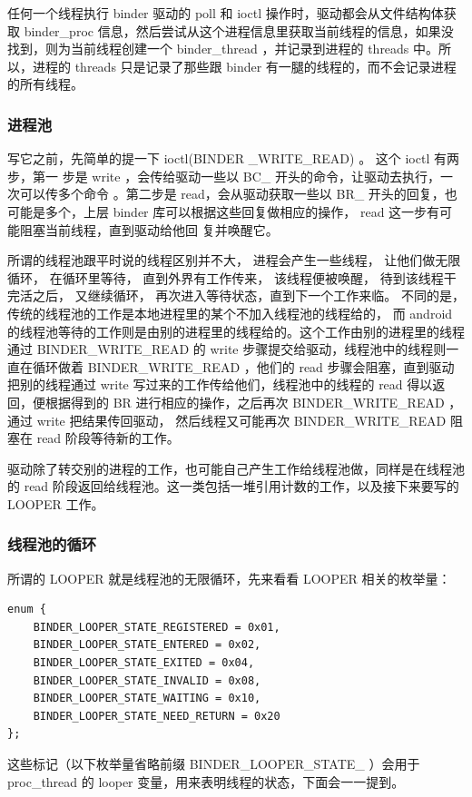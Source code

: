 \documentclass[a4paper,11pt]{article}
\begin{document}
任何一个线程执行 binder 驱动的 poll 和 ioctl 操作时，驱动都会从文件结构体获取
binder_proc 信息，然后尝试从这个进程信息里获取当前线程的信息，如果没找到，则为当前线程创建一个
binder_thread ，并记录到进程的 threads 中。所以，进程的 threads
只是记录了那些跟 binder 有一腿的线程的，而不会记录进程的所有线程。

\subsubsection{进程池}
写它之前，先简单的提一下 ioctl(BINDER _WRITE_READ) 。 这个 ioctl 有两步，第一
步是 write ，会传给驱动一些以 BC_ 开头的命令，让驱动去执行，一次可以传多个命令
。第二步是 read，会从驱动获取一些以 BR_ 开头的回复，也可能是多个，上层 binder
库可以根据这些回复做相应的操作， read 这一步有可能阻塞当前线程，直到驱动给他回
复并唤醒它。

所谓的线程池跟平时说的线程区别并不大， 进程会产生一些线程， 让他们做无限循环，
在循环里等待， 直到外界有工作传来， 该线程便被唤醒， 待到该线程干完活之后，
又继续循环， 再次进入等待状态，直到下一个工作来临。 不同的是，
传统的线程池的工作是本地进程里的某个不加入线程池的线程给的， 而 android
的线程池等待的工作则是由别的进程里的线程给的。这个工作由别的进程里的线程通过
BINDER_WRITE_READ 的 write 步骤提交给驱动，线程池中的线程则一直在循环做着
BINDER_WRITE_READ ，他们的 read 步骤会阻塞，直到驱动把别的线程通过 write
写过来的工作传给他们，线程池中的线程的 read 得以返回，便根据得到的 BR
进行相应的操作，之后再次 BINDER_WRITE_READ ，通过 write 把结果传回驱动，
然后线程又可能再次 BINDER_WRITE_READ 阻塞在 read 阶段等待新的工作。

驱动除了转交别的进程的工作，也可能自己产生工作给线程池做，同样是在线程池的 read
阶段返回给线程池。这一类包括一堆引用计数的工作，以及接下来要写的 LOOPER 工作。

\subsubsection{线程池的循环}
所谓的 LOOPER 就是线程池的无限循环，先来看看 LOOPER 相关的枚举量：
\begin{lstlisting}[multicols=2,caption=Binder Looper state]
enum {
    BINDER_LOOPER_STATE_REGISTERED = 0x01,
    BINDER_LOOPER_STATE_ENTERED = 0x02,
    BINDER_LOOPER_STATE_EXITED = 0x04,
    BINDER_LOOPER_STATE_INVALID = 0x08,
    BINDER_LOOPER_STATE_WAITING = 0x10,
    BINDER_LOOPER_STATE_NEED_RETURN = 0x20
};
\end{lstlisting}

这些标记（以下枚举量省略前缀 BINDER_LOOPER_STATE_ ）会用于 proc_thread 的
looper 变量，用来表明线程的状态，下面会一一提到。
\end{document}
